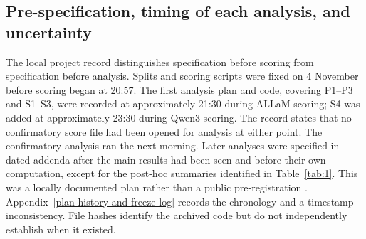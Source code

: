 \documentclass[applsci,article,submit,pdftex,oneauthor]{Definitions/mdpi}
\begin{document}
\hypertarget{pre-specification-timing-of-each-analysis-and-uncertainty}{%
\subsection{Pre-specification, timing of each analysis, and uncertainty}\label{pre-specification-timing-of-each-analysis-and-uncertainty}}

The local project record distinguishes specification before scoring from specification before analysis. Splits and scoring scripts were fixed on 4 November before scoring began at 20:57. The first analysis plan and code, covering P1--P3 and S1--S3, were recorded at approximately 21:30 during ALLaM scoring; S4 was added at approximately 23:30 during Qwen3 scoring. The record states that no confirmatory score file had been opened for analysis at either point. The confirmatory analysis ran the next morning. Later analyses were specified in dated addenda after the main results had been seen and before their own computation, except for the post-hoc summaries identified in Table~\ref{tab:1}. This was a locally documented plan rather than a public pre-registration \cite{nosek2018preregistration, vanmiltenburg2021preregistering}. Appendix~\ref{plan-history-and-freeze-log} records the chronology and a timestamp inconsistency. File hashes identify the archived code but do not independently establish when it existed.
\end{document}
